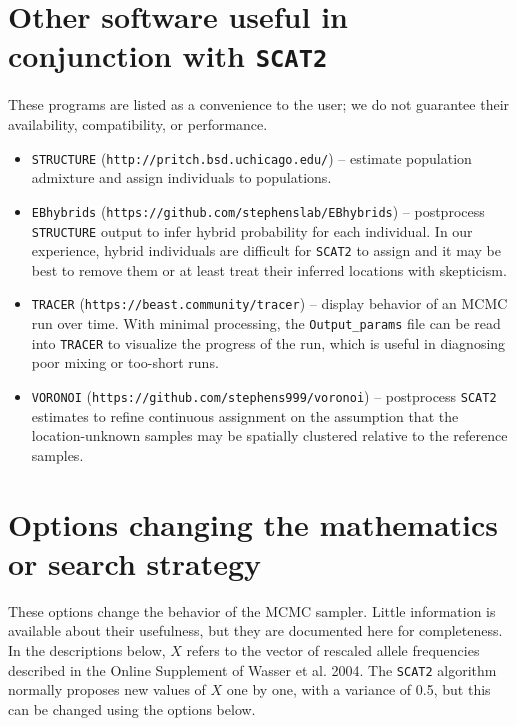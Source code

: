 \documentclass[10pt,titlepage,times,letterpaper]{article}
\def\SCAT{{\tt SCAT2} }
\begin{document}
\section{Other software useful in conjunction with \SCAT} \label{software}

These programs are listed as a convenience to the user; we do not
guarantee their availability, compatibility, or performance.

\begin{itemize}
\item {\tt STRUCTURE} ({\tt http://pritch.bsd.uchicago.edu/}) -- estimate
population admixture and assign individuals to populations.
\item {\tt EBhybrids} ({\tt https://github.com/stephenslab/EBhybrids}) -- 
postprocess {\tt STRUCTURE} output to infer hybrid probability for each 
individual.  In our experience, hybrid individuals are difficult for \SCAT 
to assign and it may be best to remove them or at least treat their
inferred locations with skepticism.
\item {\tt TRACER} ({\tt https://beast.community/tracer}) -- display behavior
of an MCMC run over time.  With minimal processing, the {\tt Output\_params}
file can be read into {\tt TRACER} to visualize the progress of the run,
which is useful in diagnosing poor mixing or too-short runs.
\item {\tt VORONOI} ({\tt https://github.com/stephens999/voronoi}) --
postprocess \SCAT estimates to refine continuous assignment on the
assumption that the location-unknown samples may be spatially clustered
relative to the reference samples.
\end{itemize}

\section{Options changing the mathematics or search strategy}

These options change the behavior of the MCMC sampler.  Little information
is available about their usefulness, but they
are documented here for completeness.  In the descriptions below, $X$ refers
to the vector of rescaled allele frequencies described in the
Online Supplement of Wasser et al. 2004.  The \SCAT algorithm normally
proposes new values of $X$ one by one, with a variance of 0.5, but
this can be changed using the options below.
\end{document}
